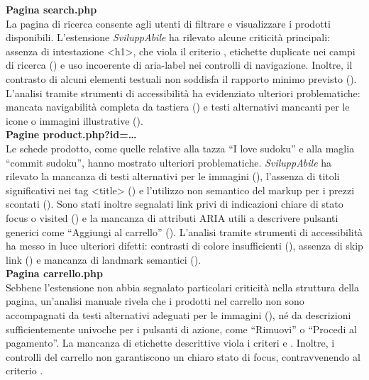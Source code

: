 \noindent \textbf{Pagina search.php}\\
La pagina di ricerca consente agli utenti di filtrare e visualizzare i prodotti disponibili. 
L’estensione \textit{SviluppAbile} ha rilevato alcune criticità principali: assenza di intestazione <h1>, che viola il criterio {}, etichette duplicate nei campi di ricerca ({}) e uso incoerente di aria-label nei controlli di navigazione. Inoltre, il contrasto di alcuni elementi testuali non soddisfa il rapporto minimo previsto ({}).\\
L’analisi tramite strumenti di accessibilità ha evidenziato ulteriori problematiche: mancata navigabilità completa da tastiera ({}) e testi alternativi mancanti per le icone o immagini illustrative ({}).\\

\noindent \textbf{Pagine product.php?id=…}\\
Le schede prodotto, come quelle relative alla tazza “I love sudoku” e alla maglia “commit sudoku”, hanno mostrato ulteriori problematiche. \textit{SviluppAbile} ha rilevato la mancanza di testi alternativi per le immagini ({}), l’assenza di titoli significativi nei tag <title> ({}) e l’utilizzo non semantico del markup per i prezzi scontati ({}). Sono stati inoltre segnalati link privi di indicazioni chiare di stato focus o visited ({}) e la mancanza di attributi ARIA utili a descrivere pulsanti generici come “Aggiungi al carrello” ({}).
L’analisi tramite strumenti di accessibilità ha messo in luce ulteriori difetti: contrasti di colore insufficienti ({}), assenza di skip link ({}) e mancanza di landmark semantici ({}).\\

\noindent \textbf{Pagina carrello.php}\\
Sebbene l’estensione non abbia segnalato particolari criticità nella struttura della pagina, un’analisi manuale rivela che i prodotti nel carrello non sono accompagnati da testi alternativi adeguati per le immagini ({}), né da descrizioni sufficientemente univoche per i pulsanti di azione, come “Rimuovi” o “Procedi al pagamento”. La mancanza di etichette descrittive viola i criteri {} e {}. Inoltre, i controlli del carrello non garantiscono un chiaro stato di focus, contravvenendo al criterio {}.\\

